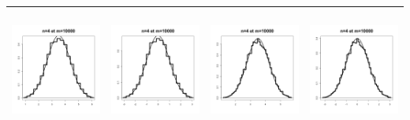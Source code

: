 \documentclass[10pt]{report}
\begin{document}
\begin{exercice}
\begin{enumerate}
\begin{tabular}{|c|c|c|c|}
\includegraphics[width=4cm,height=4cm]{img/n4MoyDes} & \includegraphics[width=4cm,height=4cm]{img/n4DeltaMoyDes} & \includegraphics[width=4cm,height=4cm]{img/n4MoyUnifs} & \includegraphics[width=4cm,height=4cm]{img/n4DeltaMoyUnifs}\\\hline

\end{tabular}
\end{enumerate}
\end{exercice}
\end{document}
